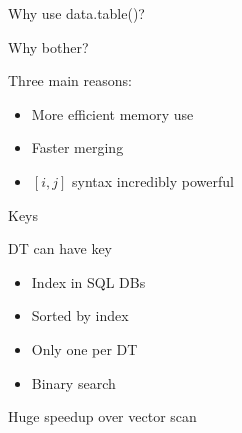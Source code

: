 \documentclass[12pt]{beamer}
\begin{document}
\begin{frame}{Why use data.table()?}

Why bother?

\vspace{5mm}

\pause Three main reasons:

\begin{itemize}
\pause \item More efficient memory use
\pause \item Faster merging
\pause \item $[i, j]$ syntax incredibly powerful
\end{itemize}

\end{frame}


\begin{frame}{Keys}

DT can have key

\pause
\begin{itemize}
\item Index in SQL DBs
\pause \item Sorted by index
\pause \item Only one per DT
\pause \item Binary search
\end{itemize}

\pause
Huge speedup over vector scan

\end{frame}
\end{document}
